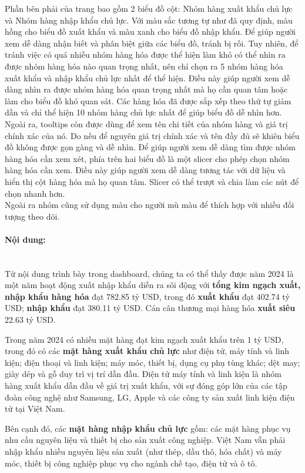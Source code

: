 \documentclass[a4paper]{report}
\begin{document}
{{Phần bên phải của trang bao gồm 2 biểu đồ cột: Nhóm hàng xuất khẩu chủ lực và Nhóm hàng nhập khẩu chủ lực. Với màu sắc tương tự như đã quy định, màu hồng cho biểu đồ xuất khẩu và màu xanh cho biểu đồ nhập khẩu. Để giúp người xem dễ dàng nhận biết và phân biệt giữa các biểu đồ, tránh bị rối.
Tuy nhiên, để tránh việc có quá nhiều nhóm hàng hóa được thể hiện làm khó có thể nhìn ra được nhóm hàng hóa nào quan trọng nhất, nên chỉ chọn ra 5 nhóm hàng hóa xuất khẩu và nhập khẩu chủ lực nhất để thể hiện. Điều này giúp người xem dễ dàng nhìn ra được nhóm hàng hóa quan trọng nhất mà họ cần quan tâm hoặc làm cho biểu đồ khó quan sát. Các hàng hóa đã được sắp xếp
theo thứ tự giảm dần và chỉ thể hiện 10 nhóm hàng chủ lực nhất để giúp biểu đồ dễ nhìn hơn. Ngoài ra, tooltips còn được dùng để xem tên chi tiết của nhóm hàng và giá trị chính xác của nó. Do nếu để nguyên giá trị chính xác và tên đầy đủ sẽ khiên biểu đồ không được gọn gàng và dễ nhìn.
Để giúp người xem dễ dàng tìm được nhóm hàng hóa cần xem xét, phía trên hai biểu đồ là một slicer cho phép chọn nhóm hàng hóa cần xem. Điều này giúp người xem dễ dàng tương tác với dữ liệu và hiển thị cột hàng hóa mà họ quan tâm. Slicer có thể trượt và chia làm các nút để chọn nhanh hơn.\\

Ngoài ra nhóm cũng sử dụng màu cho người mù màu để thích hợp với nhiều đối tượng theo dõi.

\paragraph{Nội dung:} \mbox{}\\
Từ nội dung trình bày trong dashboard, chúng ta có thể thấy được năm 2024 là một năm hoạt động xuất nhập khẩu diễn ra sôi động với \textbf{tổng kim ngạch xuất, nhập khẩu hàng hóa} đạt 782.85 tỷ USD, trong đó \textbf{xuất khẩu} đạt 402.74 tỷ USD; \textbf{nhập khẩu} đạt 380.11 tỷ USD. Cán cân thương mại hàng hóa \textbf{xuất siêu} 22.63 tỷ USD.

Trong năm 2024 có nhiều mặt hàng đạt kim ngạch xuất khẩu trên 1 tỷ USD, trong đó có các \textbf{mặt hàng xuất khẩu chủ lực} như điện tử, máy tính và linh kiện; điện thoại và linh kiện; máy móc, thiết bị, dụng cụ phụ tùng khác; dệt may; giày dép và gỗ duy trì vị trí dẫn đầu. Điện tử máy tính và linh kiện là nhóm hàng xuất khẩu dẫn đầu về giá trị xuất khẩu, với sự đóng góp lớn của các tập đoàn công nghệ như Samsung, LG, Apple và các công ty sản xuất linh kiện điện tử tại Việt Nam.

Bên cạnh đó, các \textbf{mặt hàng nhập khẩu chủ lực} gồm: các mặt hàng phục vụ nhu cầu nguyên liệu và thiết bị cho sản xuất công nghiệp. Việt Nam vẫn phải nhập khẩu nhiều nguyên liệu sản xuất (như thép, dầu thô, hóa chất) và máy móc, thiết bị công nghiệp phục vụ cho ngành chế tạo, điện tử và ô tô. 

}}
\end{document}

